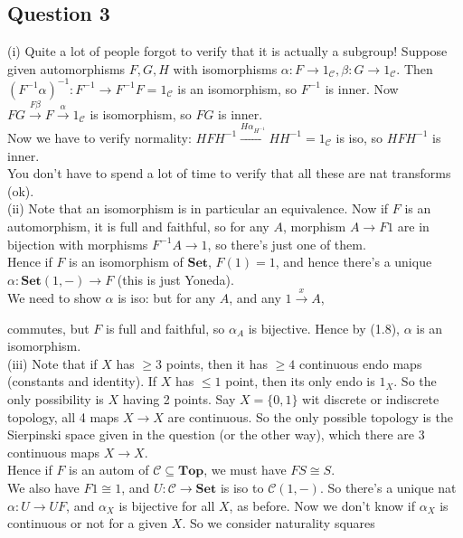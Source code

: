 \documentclass[a4paper]{article}
\begin{document}
\subsection{Question 3}
(i) Quite a lot of people forgot to verify that it is actually a subgroup! Suppose given automorphisms $F,G,H$ with isomorphisms $\alpha:F \to 1_{\mathcal{C}},\beta:G \to 1_{\mathcal{C}}$. Then $(F^{-1} \alpha)^{-1} : F^{-1} \to F^{-1}F = 1_{\mathcal{C}}$ is an isomorphism, so $F^{-1}$ is inner. Now $FG\xrightarrow{F\beta} F \xrightarrow{\alpha} 1_\mathcal{C}$ is isomorphism, so $FG$ is inner.\\
Now we have to verify normality: $HFH^{-1} \xrightarrow{H \alpha_{H^{-1}}} HH^{-1} = 1_{\mathcal{C}}$ is iso, so $HFH^{-1}$ is inner.\\
You don't have to spend a lot of time to verify that all these are nat transforms (ok).\\
(ii) Note that an isomorphism is in particular an equivalence. Now if $F$ is an automorphism, it is full and faithful, so for any $A$, morphism $A \to F1$ are in bijection with morphisms $F^{-1} A \to 1$, so there's just one of them.\\
Hence if $F$ is an isomorphism of $\mathbf{Set}$, $F(1) = 1$, and hence there's a unique $\alpha: \mathbf{Set} (1,-) \to F$ (this is just Yoneda).\\
We need to show $\alpha$ is iso: but for any $A$, and any $1 \xrightarrow{x} A$, 
commutes, but $F$ is full and faithful, so $\alpha_A$ is bijective. Hence by (1.8), $\alpha$ is an isomorphism.\\
(iii) Note that if $X$ has $\geq 3$ points, then it has $\geq 4$ continuous endo maps (constants and identity). If $X$ has $\leq 1$ point, then its only endo is $1_X$. So the only possibility is $X$ having 2 points. Say $X = \{0,1\}$ wit discrete or indiscrete topology, all 4 maps $X \to X$ are continuous. So the only possible topology is the Sierpinski space given in the question (or the other way), which there are 3 continuous maps $X \to X$.\\
Hence if $F$ is an autom of $\mathcal{C} \subseteq \mathbf{Top}$, we must have $FS \cong S$.\\
We also have $F1 \cong 1$, and $U:\mathcal{C} \to \mathbf{Set}$ is iso to $\mathcal{C} (1,-)$. So there's a unique nat $\alpha: U \to UF$, and $\alpha_X$ is bijective for all $X$, as before. Now we don't know if $\alpha_X$ is continuous or not for a given $X$. So we consider naturality squares
\end{document}
